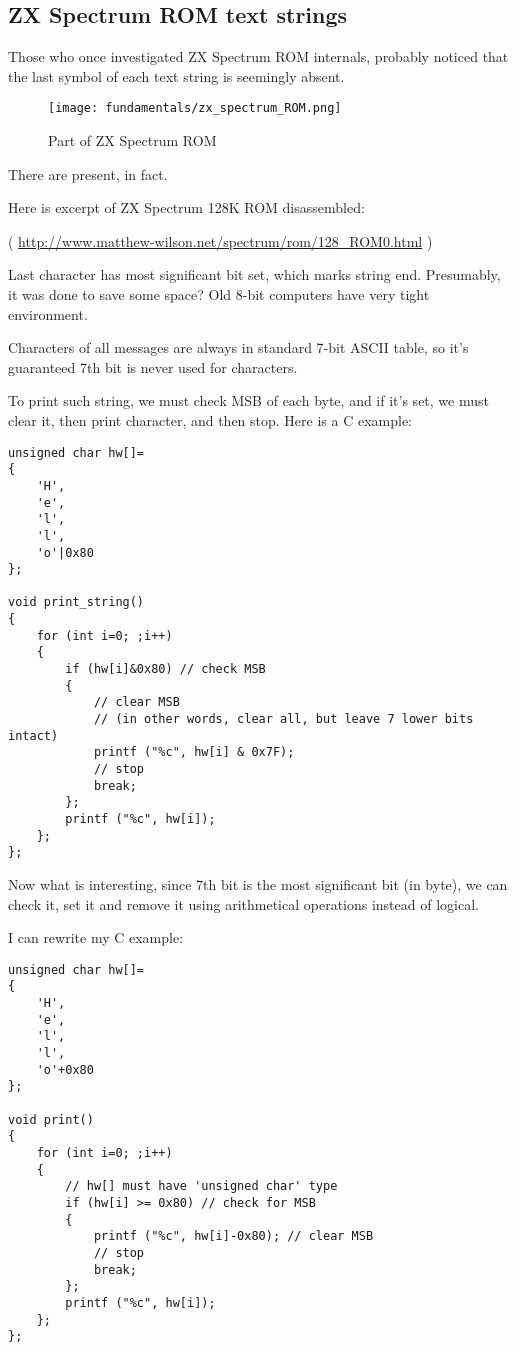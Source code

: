 \label{AND_OR_as_SUB_ADD}

\subsection{ZX Spectrum ROM text strings}

Those who once investigated ZX Spectrum \ac{ROM} internals, probably noticed that the last symbol of each text string is seemingly
absent.

\begin{figure}[H]
\centering
\texttt{[image: fundamentals/zx\_spectrum\_ROM.png]}
\caption{Part of ZX Spectrum ROM}
\end{figure}

There are present, in fact.

Here is excerpt of ZX Spectrum 128K ROM disassembled:


( \url{http://www.matthew-wilson.net/spectrum/rom/128_ROM0.html} )

Last character has most significant bit set, which marks string end.
Presumably, it was done to save some space?
Old 8-bit computers have very tight environment.

Characters of all messages are always in standard 7-bit \ac{ASCII} table,
so it's guaranteed 7th bit is never used for characters.

To print such string, we must check \ac{MSB} of each byte, and if it's set, we must clear it, then print character,
and then stop.
Here is a C example:

\begin{lstlisting}[style=customc]
unsigned char hw[]=
{
	'H',
	'e',
	'l',
	'l',
	'o'|0x80
};

void print_string()
{
	for (int i=0; ;i++)
	{
		if (hw[i]&0x80) // check MSB
		{
			// clear MSB
			// (in other words, clear all, but leave 7 lower bits intact)
			printf ("%c", hw[i] & 0x7F);
			// stop
			break;
		};
		printf ("%c", hw[i]);
	};
};
\end{lstlisting}

Now what is interesting, since 7th bit is the most significant bit (in byte), we can check it, set it and remove it using
arithmetical operations instead of logical.

I can rewrite my C example:

\begin{lstlisting}[style=customc]
unsigned char hw[]=
{
	'H',
	'e',
	'l',
	'l',
	'o'+0x80
};

void print()
{
	for (int i=0; ;i++)
	{
		// hw[] must have 'unsigned char' type
		if (hw[i] >= 0x80) // check for MSB
		{
			printf ("%c", hw[i]-0x80); // clear MSB
			// stop
			break;
		};
		printf ("%c", hw[i]);
	};
};
\end{lstlisting}

